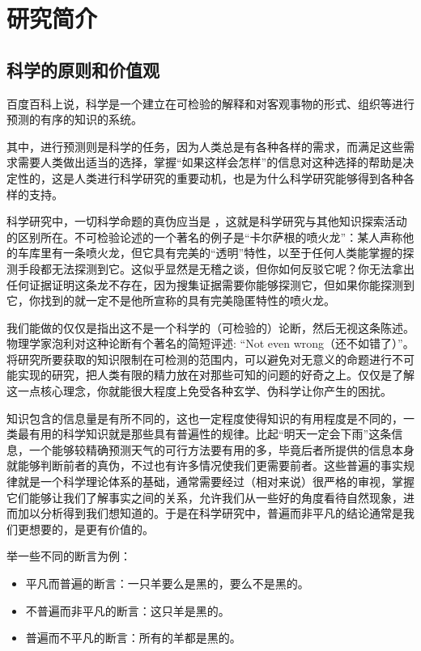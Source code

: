 \documentclass[a4paper,10pt,english]{sphinxmanual}
\begin{document}
\chapter{研究简介}
\label{\detokenize{3. Intro_Research::doc}}\label{\detokenize{3. Intro_Research:id1}}

\section{科学的原则和价值观}
\label{\detokenize{3. Intro_Research:id2}}
百度百科上说，科学是一个建立在可检验的解释和对客观事物的形式、组织等进行预测的有序的知识的系统。

其中，进行预测则是科学的任务，因为人类总是有各种各样的需求，而满足这些需求需要人类做出适当的选择，掌握“如果这样会怎样”的信息对这种选择的帮助是决定性的，这是人类进行科学研究的重要动机，也是为什么科学研究能够得到各种各样的支持。

科学研究中，一切科学命题的真伪应当是  ，这就是科学研究与其他知识探索活动的区别所在。不可检验论述的一个著名的例子是“卡尔萨根的喷火龙”：某人声称他的车库里有一条喷火龙，但它具有完美的“透明”特性，以至于任何人类能掌握的探测手段都无法探测到它。这似乎显然是无稽之谈，但你如何反驳它呢？你无法拿出任何证据证明这条龙不存在，因为搜集证据需要你能够探测它，但如果你能探测到它，你找到的就一定不是他所宣称的具有完美隐匿特性的喷火龙。

我们能做的仅仅是指出这不是一个科学的（可检验的）论断，然后无视这条陈述。物理学家泡利对这种论断有个著名的简短评述: “Not even wrong（还不如错了）”。 将研究所要获取的知识限制在可检测的范围内，可以避免对无意义的命题进行不可能实现的研究，把人类有限的精力放在对那些可知的问题的好奇之上。仅仅是了解这一点核心理念，你就能很大程度上免受各种玄学、伪科学让你产生的困扰。

知识包含的信息量是有所不同的，这也一定程度使得知识的有用程度是不同的，一类最有用的科学知识就是那些具有普遍性的规律。比起“明天一定会下雨”这条信息，一个能够较精确预测天气的可行方法要有用的多，毕竟后者所提供的信息本身就能够判断前者的真伪，不过也有许多情况使我们更需要前者。这些普遍的事实规律就是一个科学理论体系的基础，通常需要经过（相对来说）很严格的审视，掌握它们能够让我们了解事实之间的关系，允许我们从一些好的角度看待自然现象，进而加以分析得到我们想知道的。于是在科学研究中，普遍而非平凡的结论通常是我们更想要的，是更有价值的。

举一些不同的断言为例：
\begin{itemize}
\item {} 
平凡而普遍的断言：一只羊要么是黑的，要么不是黑的。

\item {} 
不普遍而非平凡的断言：这只羊是黑的。

\item {} 
普遍而不平凡的断言：所有的羊都是黑的。

\end{itemize}
\end{document}

